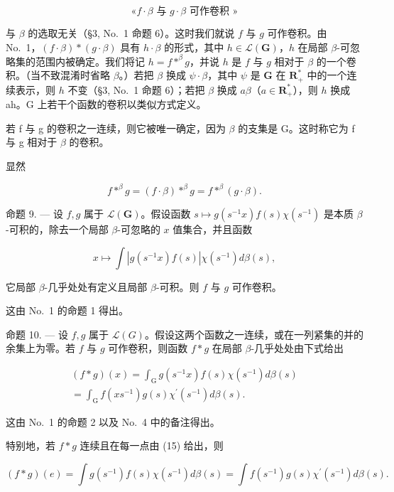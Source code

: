 \[\text{«}f \cdot \beta\text{ 与 }g \cdot \beta\text{ 可作卷积 »}\]

与 \(\beta\) 的选取无关（§3, No.~1 命题 6）。这时我们就说 \(f\) 与 \(g\) 可作卷积。由 No.~1，\((f\cdot \beta)*(g\cdot \beta)\) 具有 \(h\cdot \beta\) 的形式，其中 \(h\in \mathcal{L}(\mathbf{G})\)，\(h\) 在局部 \(\beta\)-可忽略集的范围内被确定。我们将记 \(h = f * ^ {\beta} g\)，并说 \(h\) 是 \(f\) 与 \(g\) 相对于 \(\beta\) 的一个卷积。（当不致混淆时省略 \(\beta\)。）若把 \(\beta\) 换成 \(\psi \cdot \beta\)，其中 \(\psi\) 是 \(\mathbf{G}\) 在 \(\mathbf{R}_+^*\) 中的一个连续表示，则 \(h\) 不变（§3, No.~1 命题 6）；若把 \(\beta\) 换成 \(a\beta\)（\(a\in \mathbf{R}_+^*\)），则 \(h\) 换成 ah。G 上若干个函数的卷积以类似方式定义。

若 f 与 g 的卷积之一连续，则它被唯一确定，因为 \(\beta\) 的支集是 G。这时称它为 f 与 g 相对于 \(\beta\) 的卷积。

显然

\[
f * ^ {\beta} g = (f \cdot \beta) * ^ {\beta} g = f * ^ {\beta} (g \cdot \beta).\tag{14}
\]

命题 9. --- 设 \(f,g\) 属于 \(\mathcal{L}(\mathbf{G})\)。假设函数 \(s\mapsto g(s^{-1}x)f(s)\chi(s^{-1})\) 是本质 \(\beta\)-可积的，除去一个局部 \(\beta\)-可忽略的 \(x\) 值集合，并且函数

\[
x \mapsto \int | g (s ^ {- 1} x) f (s) | \chi (s ^ {- 1}) d \beta (s),
\]

它局部 \(\beta\)-几乎处处有定义且局部 \(\beta\)-可积。则 \(f\) 与 \(g\) 可作卷积。

这由 No.~1 的命题 1 得出。

命题 10. --- 设 \(f, g\) 属于 \(\mathcal{L}(G)\)。假设这两个函数之一连续，或在一列紧集的并的余集上为零。若 \(f\) 与 \(g\) 可作卷积，则函数 \(f * g\) 在局部 \(\beta\)-几乎处处由下式给出

\[
\begin{array}{c} (f * g) (x) = \int_ {\mathrm{G}} g (s ^ {- 1} x) f (s) \chi (s ^ {- 1}) d \beta (s) \\ = \int_ {\mathrm{G}} f (x s ^ {- 1}) g (s) \chi^ {\prime} (s ^ {- 1}) d \beta (s). \end{array}\tag{15}
\]

这由 No.~1 的命题 2 以及 No.~4 中的备注得出。

特别地，若 \(f * g\) 连续且在每一点由 (15) 给出，则

\[
(f * g) (e) = \int g (s ^ {- 1}) f (s) \chi (s ^ {- 1}) d \beta (s) = \int f (s ^ {- 1}) g (s) \chi^ {\prime} (s ^ {- 1}) d \beta (s).\tag{16}
\]

